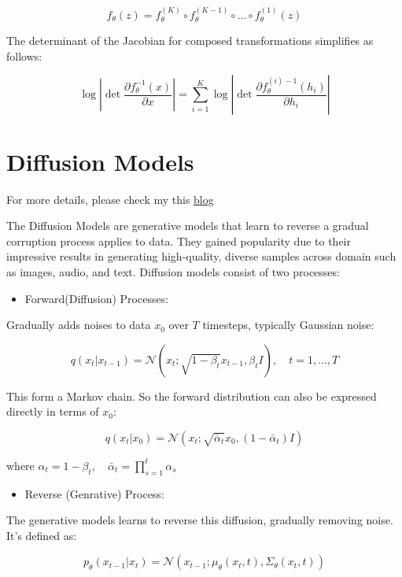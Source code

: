 \documentclass[
  12pt,
]{article}
\providecommand{\tightlist}{%
  \setlength{\itemsep}{0pt}\setlength{\parskip}{0pt}}\usepackage{longtable,booktabs,array}
\theoremstyle{plain}
\theoremstyle{remark}
\begin{document}
\[
f_{\theta}(z) = f_{\theta}^{(K)} \circ f_{\theta}^{(K-1)} \circ \dots \circ f_{\theta}^{(1)}(z)
\]

The determinant of the Jacobian for composed transformations simplifies
as follows:

\[
\log \left| \det \frac{\partial f_{\theta}^{-1}(x)}{\partial x} \right|
= \sum_{i=1}^{K} \log \left| \det \frac{\partial f_{\theta}^{(i)-1}(h_i)}{\partial h_i} \right|
\]

\section{Diffusion Models}\label{diffusion-models}

For more details, please check my this
\href{https://yyzhang2000.github.io/Blog/posts/Generative\%20Model/Diffusion\%20Model.html}{blog}

The Diffusion Models are generative models that learn to reverse a
gradual corruption process applies to data. They gained popularity due
to their impressive results in generating high-quality, diverse samples
across domain such as images, audio, and text. Diffusion models consist
of two processes:

\begin{itemize}
\tightlist
\item
  Forward(Diffusion) Processes:
\end{itemize}

Gradually adds noises to data \(x_0\) over \(T\) timesteps, typically
Gaussian noise:

\[
q(x_t|x_{t-1}) = \mathcal{N}(x_t; \sqrt{1 - \beta_t}x_{t-1}, \beta_t I), \quad t = 1,\dots,T
\]

This form a Markov chain. So the forward distribution can also be
expressed directly in terms of \(x_0\):

\[
q(x_t|x_0) = \mathcal{N}(x_t; \sqrt{\bar{\alpha}_t} x_0, (1 - \bar{\alpha}_t)I)
\]

where
\(\alpha_t = 1 - \beta_t, \quad \bar{\alpha}_t = \prod_{s=1}^{t}\alpha_s\)

\begin{itemize}
\tightlist
\item
  Reverse (Genrative) Process:
\end{itemize}

The generative models learns to reverse this diffusion, gradually
removing noise. It's defined as:

\[
p_\theta(x_{t-1}|x_t) = \mathcal{N}(x_{t-1}; \mu_\theta(x_t, t), \Sigma_\theta(x_t, t))
\]
\end{document}
